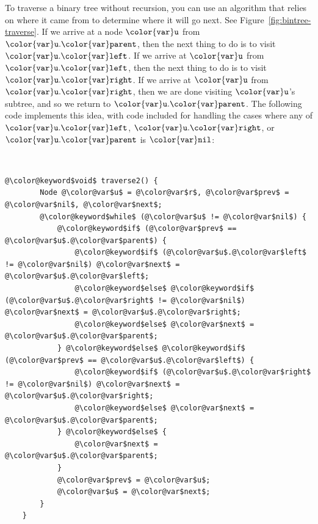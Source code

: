 \documentclass[10pt]{book}
\newcommand{\figref}[1]{Figure~\ref{fig:#1}}
\theoremstyle{plain}
\theoremstyle{definition}
\begin{document}
To traverse a binary tree without recursion, you can use an algorithm that
relies on where it came from to determine where it will go next.  See
\figref{bintree-traverse}.  If we arrive at a node \ensuremath{\mathtt{{\color{var}u}}} from \ensuremath{\mathtt{{\color{var}u}.{\color{var}parent}}},
then the next thing to do is to visit \ensuremath{\mathtt{{\color{var}u}.{\color{var}left}}}.  If we arrive at \ensuremath{\mathtt{{\color{var}u}}}
from \ensuremath{\mathtt{{\color{var}u}.{\color{var}left}}}, then the next thing to do is to visit \ensuremath{\mathtt{{\color{var}u}.{\color{var}right}}}.  If we
arrive at \ensuremath{\mathtt{{\color{var}u}}} from \ensuremath{\mathtt{{\color{var}u}.{\color{var}right}}}, then we are done visiting \ensuremath{\mathtt{{\color{var}u}}}'s subtree,
and so we return to \ensuremath{\mathtt{{\color{var}u}.{\color{var}parent}}}.  The following code implements this
idea, with code included for handling the cases where any of \ensuremath{\mathtt{{\color{var}u}.{\color{var}left}}},
\ensuremath{\mathtt{{\color{var}u}.{\color{var}right}}}, or \ensuremath{\mathtt{{\color{var}u}.{\color{var}parent}}} is \ensuremath{\mathtt{{\color{var}nil}}}:


 \ \vspace{.5ex}\begin{Verbatim}[gobble=1,tabsize=2,frame=single,framerule=1.2pt,commandchars=\\@\$,label=\texttt{BinaryTree},labelposition=topline]
	@\color@keyword$void$ traverse2() {
		Node @\color@var$u$ = @\color@var$r$, @\color@var$prev$ = @\color@var$nil$, @\color@var$next$;
		@\color@keyword$while$ (@\color@var$u$ != @\color@var$nil$) {
			@\color@keyword$if$ (@\color@var$prev$ == @\color@var$u$.@\color@var$parent$) {
				@\color@keyword$if$ (@\color@var$u$.@\color@var$left$ != @\color@var$nil$) @\color@var$next$ = @\color@var$u$.@\color@var$left$;
				@\color@keyword$else$ @\color@keyword$if$ (@\color@var$u$.@\color@var$right$ != @\color@var$nil$) @\color@var$next$ = @\color@var$u$.@\color@var$right$;
				@\color@keyword$else$ @\color@var$next$ = @\color@var$u$.@\color@var$parent$;
			} @\color@keyword$else$ @\color@keyword$if$ (@\color@var$prev$ == @\color@var$u$.@\color@var$left$) {
				@\color@keyword$if$ (@\color@var$u$.@\color@var$right$ != @\color@var$nil$) @\color@var$next$ = @\color@var$u$.@\color@var$right$;
				@\color@keyword$else$ @\color@var$next$ = @\color@var$u$.@\color@var$parent$;
			} @\color@keyword$else$ {
				@\color@var$next$ = @\color@var$u$.@\color@var$parent$;
			}
			@\color@var$prev$ = @\color@var$u$;
			@\color@var$u$ = @\color@var$next$;
		}
	}
\end{Verbatim}
\end{document}

